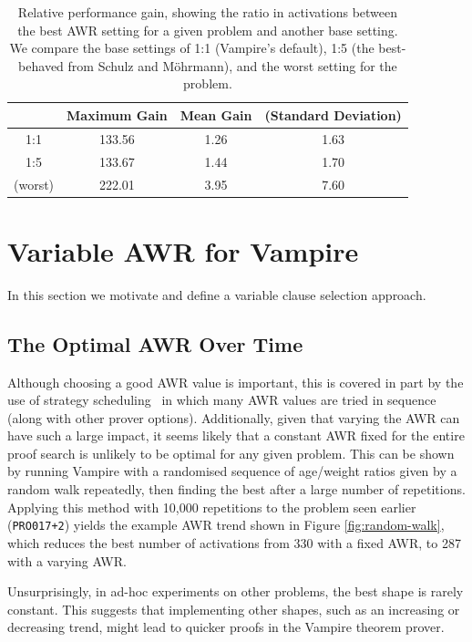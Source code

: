 \documentclass{llncs}
\newcommand{\sandm}{Schulz and M{\"{o}}hrmann}
\begin{document}
\begin{table}
	\caption{Relative performance gain, showing the ratio in activations between the best AWR setting for a given problem and another base setting. We compare the base settings of 1:1 (Vampire's default), 1:5 (the best-behaved from \sandm), and the worst setting for the problem.}
	\centering
	\begin{tabular}{c | c | c c}
		& Maximum Gain & Mean Gain & (Standard Deviation)\\
		\hline
		1:1 & 133.56 & 1.26 & 1.63 \\
		1:5 & 133.67 & 1.44 & 1.70 \\
		(worst) & 222.01 & 3.95 & 7.60 \\
	\end{tabular}
	\label{tab:awr-improvement}
\end{table}

\section{Variable AWR for Vampire} 

In this section we motivate and define a variable clause selection approach.

\subsection{The Optimal AWR Over Time} \label{sec:varying:study}

Although choosing a good AWR value is important, this is covered in part by the use of strategy scheduling~\cite{CADE18} in which many AWR values are tried in sequence (along with other prover options).
Additionally, given that varying the AWR can have such a large impact, it seems likely that a constant AWR fixed for the entire proof search is unlikely to be optimal for any given problem.
This can be shown by running Vampire with a randomised sequence of age/weight ratios given by a random walk repeatedly, then finding the best after a large number of repetitions.
Applying this method with 10,000 repetitions to the problem seen earlier (\texttt{PRO017+2}) yields the example AWR trend shown in Figure \ref{fig:random-walk}, which reduces the best number of activations from 330 with a fixed AWR, to 287 with a varying AWR.

Unsurprisingly, in ad-hoc experiments on other problems, the best shape is rarely constant.
This suggests that implementing other shapes, such as an increasing or decreasing trend, might lead to quicker proofs in the Vampire theorem prover.
\end{document}
